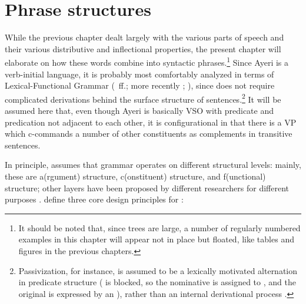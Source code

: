 

\chapter{Phrase structures}
\label{ch:phrasestruct}

While the previous chapter dealt largely with the various parts of speech and
their various distributive and inflectional properties, the present chapter
will elaborate on how these words combine into syntactic phrases.\footnote{It
should be noted that, since trees are large, a number of regularly numbered
examples in this chapter will appear not in place but floated, like tables and
figures in the previous chapters.} Since Ayeri is a verb-initial language, it
is probably most comfortably analyzed in terms of Lexical-Functional Grammar
(\cite{bresnan1982}~ff.; more recently \cite{bresnan2016};
\cite{dalrymple2001}), since \Lfg{} does not require complicated derivations
behind the surface structure of sentences.\footnote{Passivization, for
instance, is assumed to be a lexically motivated alternation in predicate
structure (\Sbj{} is blocked, so the nominative is assigned to \Obj{}, and the
original \Sbj{} is expressed  by an \Adjc{}), rather than an internal
derivational process \citep[23\psqq]{bresnan2016}.} It will be assumed here
that, even though Ayeri is basically VSO with predicate and predication not
adjacent to each other, it is configurational in that there is a VP which
c-commands a number of other constituents as complements in transitive
sentences.

In principle, \Lfg{} assumes that grammar operates on different structural 
levels: mainly, these are a(rgument) structure, c(onstituent) structure, and 
f(unctional) structure; other layers have been proposed by different 
researchers for different purposes \citep[862--865]{buttking2015}. 
\citet{bresnan2016} define three core design principles for \Lfg{}:

